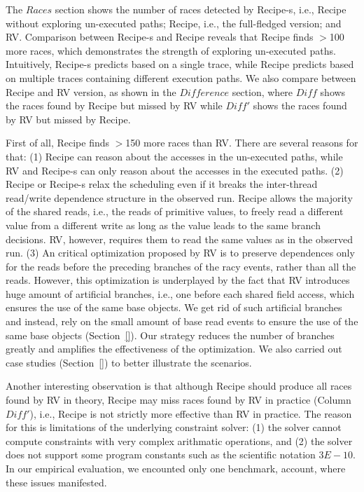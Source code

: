 The $Races$ section shows the number of races detected by {\sf Recipe-s}, i.e., {\sf Recipe} without exploring un-executed paths; {\sf Recipe}, i.e., the full-fledged version; and {\sf RV}. Comparison between {\sf Recipe-s} and {\sf Recipe} reveals that {\sf Recipe} finds $>$100 more races, which demonstrates the strength of exploring  un-executed paths. Intuitively,  {\sf Recipe-s} predicts based on a single trace, while {\sf Recipe} predicts based on multiple traces containing different execution paths. We also compare between {\sf Recipe} and {\sf RV} version, as shown in the $Difference$ section, where $Diff$ shows the races found by {\sf Recipe} but missed by {\sf RV} while $Diff'$ shows the races found by {\sf RV} but missed by {\sf Recipe}.

First of all, {\sf Recipe} finds $>$150 more races than {\sf RV}. There are several reasons for that: (1) {\sf Recipe} can reason about the accesses in the un-executed paths, while {\sf RV} and {\sf Recipe-s} can only reason about the accesses in the executed paths. (2) {\sf Recipe} or {\sf Recipe-s} relax the scheduling even if it breaks the inter-thread read/write dependence structure in the observed run. {\sf Recipe} allows the majority of the shared reads, i.e., the reads of primitive values, to freely read a different value from a different write as long as the value leads to the same branch decisions. {\sf RV}, however, requires them to read the same values as in the observed run. (3) An critical optimization proposed by {\sf RV} is to preserve dependences only for the reads before the preceding branches  of the racy events, rather than all the reads. However, this optimization is underplayed by the fact that {\sf RV} introduces huge amount of artificial branches, i.e., one before each shared field access, which ensures the use of the same base objects.
We get rid of such artificial branches and instead, rely on the small amount of base read events to ensure the use of the same base objects (Section~\ref{}). Our strategy reduces the number of branches greatly and amplifies the effectiveness of the optimization. We also carried out case studies (Section~\ref{}) to better illustrate the scenarios.

 

Another interesting observation is that although {\sf Recipe} should produce all races found by {\sf RV} in theory, {\sf Recipe} may miss races found by {\sf RV} in practice (Column $Diff'$), i.e., {\sf Recipe} is not strictly more effective than {\sf RV} in practice. The reason for this is limitations of the underlying constraint solver: (1) the solver cannot compute constraints with very complex arithmatic operations, and (2) the solver does not support some program constants such as the scientific notation $3E-10$. In our empirical evaluation, we encounted only one benchmark, account, where these issues manifested.

